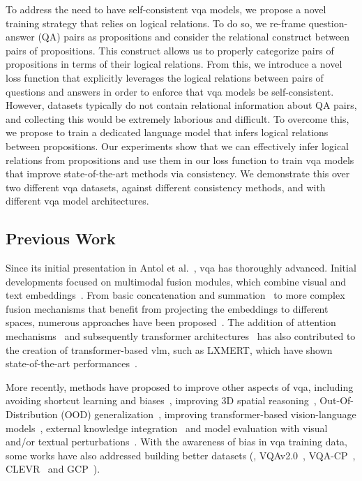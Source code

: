 To address the need to have self-consistent \gls{vqa} models, we propose a novel training strategy that relies on logical relations. To do so, we re-frame question-answer (QA) pairs as propositions and consider the relational construct between pairs of propositions. This construct allows us to properly categorize pairs of propositions in terms of their logical relations. From this, we introduce a novel loss function that explicitly leverages the logical relations between pairs of questions and answers in order to enforce that \gls{vqa} models be self-consistent. However, datasets typically do not contain relational information about QA pairs, and collecting this would be extremely laborious and difficult. To overcome this, we propose to train a dedicated language model that infers logical relations between propositions.
Our experiments show that we can effectively infer logical relations from propositions and use them in our loss function to train \gls{vqa} models that improve state-of-the-art methods via consistency. We demonstrate this over two different \gls{vqa} datasets, against different consistency methods, and with different \gls{vqa} model architectures.

\subsection{Previous Work}
Since its initial presentation in Antol et al.~\cite{antol2015vqa}, \gls{vqa} has thoroughly advanced. Initial developments focused on multimodal fusion modules, which combine visual and text embeddings~\cite{nam2017dual,cadene2019murel}. From basic concatenation and summation~\cite{antol2015vqa} to more complex fusion mechanisms that benefit from projecting the embeddings to different spaces, numerous approaches have been proposed~\cite{fukui2016multimodal,kim2016hadamard,ben2017mutan}. The addition of attention mechanisms~\cite{kim2018bilinear, nam2017dual,cadene2019murel} and subsequently transformer architectures~\cite{vaswani2017attention} has also contributed to the creation of transformer-based \gls{vlm}, such as LXMERT, which have shown state-of-the-art performances~\cite{tan2019lxmert}. 

More recently, methods have proposed to improve other aspects of \gls{vqa}, including avoiding shortcut learning and biases~\cite{dancette2021beyond,han2021greedy}, improving 3D spatial reasoning~\cite{banerjee2021weakly}, Out-Of-Distribution (OOD) generalization~\cite{cao2021linguistically,teney2020unshuffling}, improving transformer-based vision-language models~\cite{yang2021auto,zhou2021trar}, external knowledge integration~\cite{ding2022mukea,gao2022transform} and model evaluation with visual and/or textual perturbations~\cite{gupta2022swapmix,walmer2022dual}. With the awareness of bias in \gls{vqa} training data, some works have also addressed building better datasets (\eg, VQAv2.0~\cite{goyal2017making}, VQA-CP~\cite{agrawal2018don}, CLEVR~\cite{johnson2017clevr} and GCP~\cite{hudson2019gqa}).

